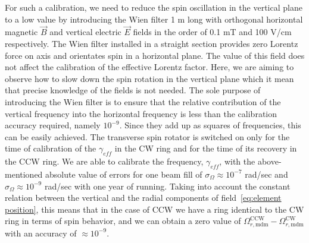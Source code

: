 \documentclass[a4paper]{jacow}
\begin{document}
For such a calibration, we need to reduce the spin oscillation in the vertical plane to a low value by introducing the Wien filter 1 m long with orthogonal horizontal magnetic $\vec{B}$  and vertical electric
$\vec{E}$ fields in the order of 0.1 mT and 100 V/cm respectively. The Wien filter installed in a straight section provides zero Lorentz force on axis and orientates spin in a horizontal plane. 
 The value of this field does not affect the calibration of the effective Lorentz factor. Here, we are aiming to observe how to slow down the spin rotation in the vertical plane which it mean that precise knowledge of the fields is not needed. The sole purpose of introducing the Wien filter is to ensure that the relative contribution of the vertical frequency into the horizontal frequency is less than the calibration accuracy required, namely $ 10^{-9}$. Since they add up as squares of frequencies, this can be easily achieved. The transverse spin rotator is switched on only for the time of calibration of the $\gamma_{eff}$ in the CW ring and for the time of its recovery in the CCW ring. We are able to calibrate the frequency, $\gamma_{eff}$, with the above-mentioned absolute value of errors for one beam fill of $\sigma_{\Omega}\approx10^{-7}$ rad/sec and $\sigma_{\Omega}\approx10^{-9}$ rad/sec with one year of running. Taking into account the constant relation between the vertical and the radial components of field~\eqref{eq:element position}, this means that in the case of CCW we have a ring identical to the CW ring in terms of spin behavior, and we can obtain a zero value of $\Omega_{r,\mathrm{mdm}}^{\mathrm{CCW}}-\Omega_{r,\mathrm{mdm}}^{\mathrm{CW}}$    with an accuracy of $\approx 10^{-9}$.
\end{document}
